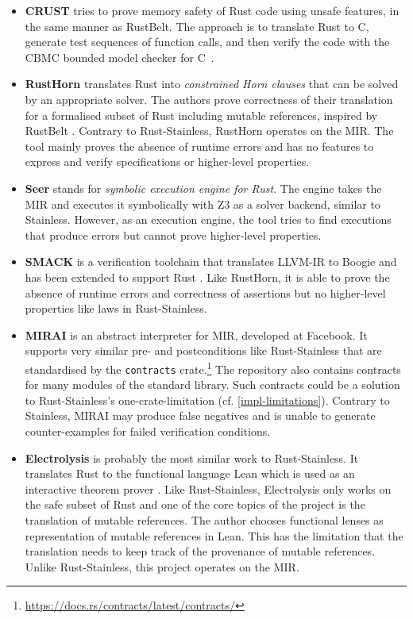 \begin{itemize}

\item \textbf{CRUST} \cite{crust} tries to prove memory safety of Rust code
using unsafe features, in the same manner as RustBelt. The approach is to
translate Rust to C, generate test sequences of function calls, and then verify
the code with the CBMC bounded model checker for C~\cite{cbmc}.

\item \textbf{RustHorn} \cite{rusthorn} translates Rust into \emph{constrained
Horn clauses} that can be solved by an appropriate solver. The authors prove
correctness of their translation for a formalised subset of Rust including
mutable references, inspired by RustBelt \cite{rustbelt}. Contrary to
Rust-Stainless, RustHorn operates on the MIR. The tool mainly proves the absence
of runtime errors and has no features to  express and verify specifications or
higher-level properties.

\item \textbf{Seer} \cite{seer} stands for \emph{symbolic execution engine for
Rust}. The engine takes the MIR and executes it symbolically with Z3 \cite{z3}
as a solver backend, similar to Stainless. However, as an execution engine, the
tool tries to find executions that produce errors but cannot prove higher-level
properties.

\item \textbf{SMACK} is a verification toolchain that translates LLVM-IR to
Boogie \cite{boogie} and  has been extended to support Rust \cite{smack}. Like
RustHorn, it is able to prove the absence of runtime errors and correctness of
assertions but no higher-level properties like laws in Rust-Stainless.

\item \textbf{MIRAI} \cite{mirai} is an abstract interpreter for MIR, developed
at Facebook. It supports very similar pre- and postconditions like
Rust-Stainless that are standardised by the \lstinline!contracts!
crate.\footnote{\url{https://docs.rs/contracts/latest/contracts/}} The
repository also contains contracts for many modules of the standard library.
Such contracts could be a solution to Rust-Stainless's one-crate-limitation
(cf. \autoref{impl-limitations}).  Contrary to Stainless, MIRAI may produce
false negatives and  is unable to generate counter-examples for failed
verification conditions.

\item \textbf{Electrolysis} \cite{electrolysis} is probably the most similar
work to Rust-Stainless. It translates Rust to the functional language Lean which
is used as an interactive theorem prover \cite{lean}. Like Rust-Stainless,
Electrolysis only works on the safe subset of Rust and one of the core topics of
the project is the translation of mutable references. The author chooses
functional lenses as representation of mutable references in Lean. This has the
limitation that the translation needs to keep track of the provenance of mutable
references. Unlike Rust-Stainless, this project operates on the MIR.


\end{itemize}
